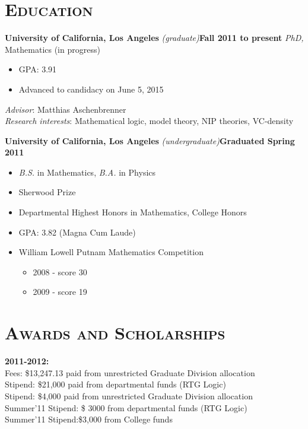 \documentclass[margin, 10pt]{res} %
\begin{document}
\begin{resume}


\section{\textsc{Education}}

\textbf{University of California, Los Angeles} {\sl (graduate)}\hfill \textbf{Fall 2011 to present}
{\sl PhD,} Mathematics (in progress)

\begin{itemize}
	\item GPA: 3.91
	\item Advanced to candidacy on June 5, 2015
\end{itemize}

{\sl Advisor}: Matthias Aschenbrenner \\
{\sl Research interests}: Mathematical logic, model theory, NIP theories, VC-density

\textbf{University of California, Los Angeles} {\sl (undergraduate)}\hfill \textbf{Graduated Spring 2011}

\begin{itemize}
	\item {\sl B.S.} in Mathematics, {\sl B.A.} in Physics
	\item Sherwood Prize
	\item Departmental Highest Honors in Mathematics, College Honors
	\item GPA: 3.82 (Magna Cum Laude)
	\item William Lowell Putnam Mathematics Competition
		\begin{itemize}
			\item 2008 - score 30
			\item 2009 - score 19
		\end{itemize}
\end{itemize}


\section{\textsc{Awards and Scholarships}}

\textbf{2011-2012:} \\

Fees: \$13,247.13 paid from unrestricted Graduate Division allocation \\
Stipend: \$21,000 paid from departmental funds (RTG Logic) \\
Stipend: \$4,000 paid from unrestricted Graduate Division allocation \\
Summer'11 Stipend: \$ 3000 from departmental funds (RTG Logic) \\
Summer'11 Stipend:\$3,000 from College funds \\


\end{resume}
\end{document}
